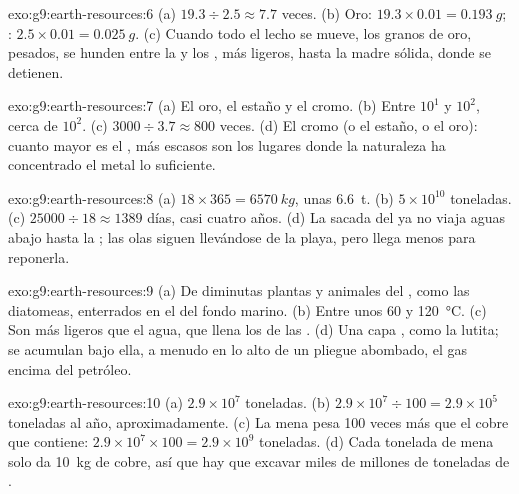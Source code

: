 \begin{solution}{exo:g9:earth-resources:6}
(a) $19.3 \div 2.5 \approx 7.7$ veces. (b) Oro: $19.3 \times 0.01 =
\qty{0.193}{g}$; : $2.5 \times 0.01 = \qty{0.025}{g}$. (c) Cuando todo
el lecho se mueve, los granos de oro, pesados, se hunden entre la  y
los , más ligeros, hasta la  madre sólida, donde se detienen.
\end{solution}

\begin{solution}{exo:g9:earth-resources:7}
(a) El oro, el estaño y el cromo. (b) Entre $10^1$ y $10^2$, cerca de
$10^2$. (c) $3000 \div 3.7 \approx 800$ veces. (d) El cromo (o el estaño, o
el oro): cuanto mayor es el , más escasos son los
lugares donde la naturaleza ha concentrado el metal lo suficiente.
\end{solution}

\begin{solution}{exo:g9:earth-resources:8}
(a) $18 \times 365 = \qty{6570}{kg}$, unas \qty{6.6}{t}. (b) $5 \times
10^{10}$ toneladas. (c) $25000 \div 18 \approx 1389$ días, casi cuatro
años. (d) La  sacada del  ya no viaja aguas abajo hasta la ;
las olas siguen llevándose  de la playa, pero llega menos para
reponerla.
\end{solution}

\begin{solution}{exo:g9:earth-resources:9}
(a) De diminutas plantas y animales del , como las diatomeas,
enterrados en el  del fondo marino. (b) Entre unos 60 y
\qty{120}{\degreeCelsius}. (c) Son más ligeros que el agua, que llena los
 de las . (d) Una capa , como la lutita; se acumulan
bajo ella, a menudo en lo alto de un pliegue abombado, el gas encima del
petróleo.
\end{solution}

\begin{solution}{exo:g9:earth-resources:10}
(a) $2.9 \times 10^7$ toneladas. (b) $2.9 \times 10^7 \div 100 = 2.9 \times
10^5$ toneladas al año, aproximadamente. (c) La mena pesa 100 veces más que
el cobre que contiene: $2.9 \times 10^7 \times 100 = 2.9 \times 10^9$
toneladas. (d) Cada tonelada de mena solo da \qty{10}{kg} de cobre, así
que hay que excavar miles de millones de toneladas de .
\end{solution}


